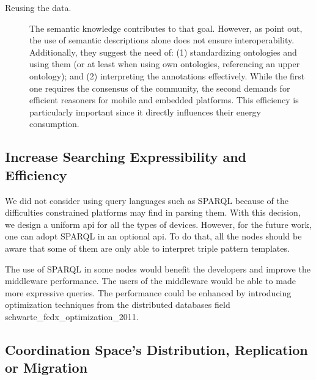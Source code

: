 \begin{description}
  \item[Reusing the data.] The semantic knowledge contributes to that goal.
			  However, as \citet{barnaghi_semantics_2012} point out, the use of semantic descriptions alone does not ensure interoperability.
			  Additionally, they suggest the need of:
			  (1) standardizing ontologies and using them (or at least when using own ontologies, referencing an upper ontology); and
			  (2) interpreting the annotations effectively. %
			  While the first one requires the consensus of the community, the second demands for efficient reasoners for mobile and embedded platforms.
			  This efficiency is particularly important since it directly influences their energy consumption.
			  
\end{description}


\subsection{Increase Searching Expressibility and Efficiency}

We did not consider using query languages such as SPARQL because of the difficulties constrained platforms may find in parsing them.
With this decision, we design a uniform \ac{api} for all the types of devices.
However, for the future work, one can adopt SPARQL in an optional \ac{api}.
To do that, all the nodes should be aware that some of them are only able to interpret triple pattern templates.

The use of SPARQL in some nodes would benefit the developers and improve the middleware performance. %
The users of the middleware would be able to made more expressive queries.
The performance could be enhanced by introducing optimization techniques from the distributed databases field \ac{schwarte_fedx_optimization_2011}. %


\subsection{Coordination Space's Distribution, Replication or Migration} %

